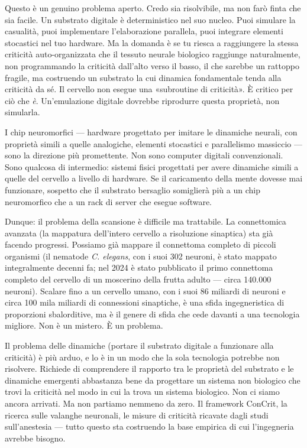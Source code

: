 \documentclass[11pt, twoside, openright]{book}
\begin{document}
Questo è un genuino problema aperto. Credo sia risolvibile, ma non farò finta che sia facile. Un substrato digitale è deterministico nel suo nucleo. Puoi simulare la casualità, puoi implementare l'elaborazione parallela, puoi integrare elementi stocastici nel tuo hardware. Ma la domanda è se tu riesca a raggiungere la stessa criticità auto-organizzata che il tessuto neurale biologico raggiunge naturalmente, non programmando la criticità dall'alto verso il basso, il che sarebbe un rattoppo fragile, ma costruendo un substrato la cui dinamica fondamentale tenda alla criticità da sé. Il cervello non esegue una «subroutine di criticità». È critico per ciò che \textit{è}. Un'emulazione digitale dovrebbe riprodurre questa proprietà, non simularla.

I chip neuromorfici --- hardware progettato per imitare le dinamiche neurali, con proprietà simili a quelle analogiche, elementi stocastici e parallelismo massiccio --- sono la direzione più promettente. Non sono computer digitali convenzionali. Sono qualcosa di intermedio: sistemi fisici progettati per avere dinamiche simili a quelle del cervello a livello di hardware. Se il caricamento della mente dovesse mai funzionare, sospetto che il substrato bersaglio somiglierà più a un chip neuromorfico che a un rack di server che esegue software.

Dunque: il problema della scansione è difficile ma trattabile. La connettomica avanzata (la mappatura dell'intero cervello a risoluzione sinaptica) sta già facendo progressi. Possiamo già mappare il connettoma completo di piccoli organismi (il nematode \textit{C. elegans}, con i suoi 302 neuroni, è stato mappato integralmente decenni fa; nel 2024 è stato pubblicato il primo connettoma completo del cervello di un moscerino della frutta adulto --- circa 140.000 neuroni). Scalare fino a un cervello umano, con i suoi 86 miliardi di neuroni e circa 100 mila miliardi di connessioni sinaptiche, è una sfida ingegneristica di proporzioni sbalorditive, ma è il genere di sfida che cede davanti a una tecnologia migliore. Non è un mistero. È un problema.

Il problema delle dinamiche (portare il substrato digitale a funzionare alla criticità) è più arduo, e lo è in un modo che la sola tecnologia potrebbe non risolvere. Richiede di comprendere il rapporto tra le proprietà del substrato e le dinamiche emergenti abbastanza bene da progettare un sistema non biologico che trovi la criticità nel modo in cui la trova un sistema biologico. Non ci siamo ancora arrivati. Ma non partiamo nemmeno da zero. Il framework ConCrit, la ricerca sulle valanghe neuronali, le misure di criticità ricavate dagli studi sull'anestesia --- tutto questo sta costruendo la base empirica di cui l'ingegneria avrebbe bisogno.
\end{document}
